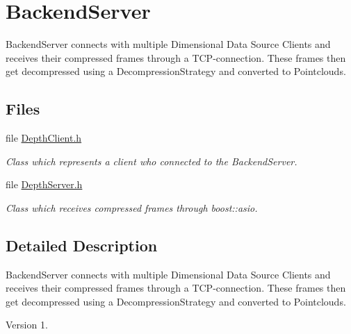 \hypertarget{group___backend_server}{\section{Backend\+Server}
\label{group___backend_server}
}


Backend\+Server connects with multiple Dimensional Data Source Clients and receives their compressed frames through a T\+C\+P-\/connection. These frames then get decompressed using a Decompression\+Strategy and converted to Pointclouds.  


\subsection*{Files}
\begin{DoxyCompactItemize}
\item 
file \hyperlink{_depth_client_8h}{Depth\+Client.\+h}
\begin{DoxyCompactList}\small\item\em Class which represents a client who connected to the Backend\+Server. \end{DoxyCompactList}\item 
file \hyperlink{_depth_server_8h}{Depth\+Server.\+h}
\begin{DoxyCompactList}\small\item\em Class which receives compressed frames through boost\+::asio. \end{DoxyCompactList}\end{DoxyCompactItemize}


\subsection{Detailed Description}
Backend\+Server connects with multiple Dimensional Data Source Clients and receives their compressed frames through a T\+C\+P-\/connection. These frames then get decompressed using a Decompression\+Strategy and converted to Pointclouds. 

\begin{DoxyVersion}{Version}
1. 
\end{DoxyVersion}
